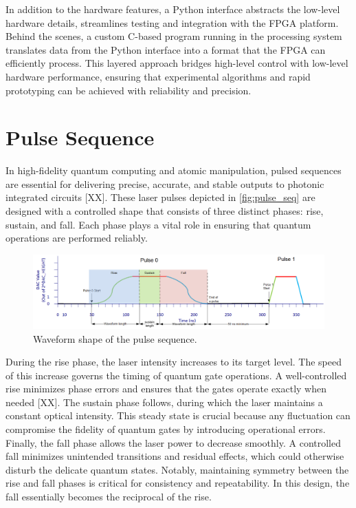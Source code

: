 In addition to the hardware features, a Python interface abstracts the low-level hardware details, streamlines testing and integration with the FPGA platform. Behind the scenes, a custom C-based program running in the processing system translates data from the Python interface into a format that the FPGA can efficiently process. This layered approach bridges high-level control with low-level hardware performance, ensuring that experimental algorithms and rapid prototyping can be achieved with reliability and precision.

\section{Pulse Sequence}

In high-fidelity quantum computing and atomic manipulation, pulsed sequences are essential for delivering precise, accurate, and stable outputs to photonic integrated circuits [XX]. These laser pulses depicted in \autoref{fig:pulse_seq} are designed with a controlled shape that consists of three distinct phases: rise, sustain, and fall. Each phase plays a vital role in ensuring that quantum operations are performed reliably.

\begin{figure}[h]
    \centering
    \includegraphics[width=1\linewidth]{figures/2.1.png}
    \caption{Waveform shape of the pulse sequence.}
    \label{fig:pulse_seq}
\end{figure}

During the rise phase, the laser intensity increases to its target level. The speed of this increase governs the timing of quantum gate operations. A well-controlled rise minimizes phase errors and ensures that the gates operate exactly when needed [XX]. The sustain phase follows, during which the laser maintains a constant optical intensity. This steady state is crucial because any fluctuation can compromise the fidelity of quantum gates by introducing operational errors. Finally, the fall phase allows the laser power to decrease smoothly. A controlled fall minimizes unintended transitions and residual effects, which could otherwise disturb the delicate quantum states. Notably, maintaining symmetry between the rise and fall phases is critical for consistency and repeatability. In this design, the fall essentially becomes the reciprocal of the rise.

